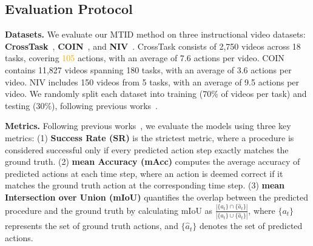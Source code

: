 
\subsection{Evaluation Protocol}
\label{sec:protocal}

\textbf{Datasets.} We evaluate our MTID method on three instructional video datasets: \textbf{CrossTask}~\citep{zhukov2019cross}, \textbf{COIN}~\citep{tang2019coin}, and \textbf{NIV}~\citep{alayrac2016unsupervised}. CrossTask consists of 2,750 videos across 18 tasks, covering \textcolor{orange}{105} actions, with an average of 7.6 actions per video. COIN contains 11,827 videos spanning 180 tasks, with an average of 3.6 actions per video. NIV includes 150 videos from 5 tasks, with an average of 9.5 actions per video. We randomly split each dataset into training (70\% of videos per task) and testing (30\%), following previous works~\citep{sun2022plate, wang2023pdpp, niu2024schema}.


\textbf{Metrics.} Following previous works~\citep{sun2022plate, zhao2022p3iv, wang2023pdpp, niu2024schema, nagasinghe2024not}, we evaluate the models using three key metrics: (1) \textbf{Success Rate (SR)} is the strictest metric, where a procedure is considered successful only if every predicted action step exactly matches the ground truth. (2) \textbf{mean Accuracy (mAcc)} computes the average accuracy of predicted actions at each time step, where an action is deemed correct if it matches the ground truth action at the corresponding time step. (3) \textbf{mean Intersection over Union (mIoU)} quantifies the overlap between the predicted procedure and the ground truth by calculating mIoU as $\frac{|\{a_t\} \cap \{\hat{a}_t\}|}{|\{a_t\} \cup \{\hat{a}_t\}|}$, where $\{a_t\}$ represents the set of ground truth actions, and $\{\hat{a}_t\}$ denotes the set of predicted actions.


